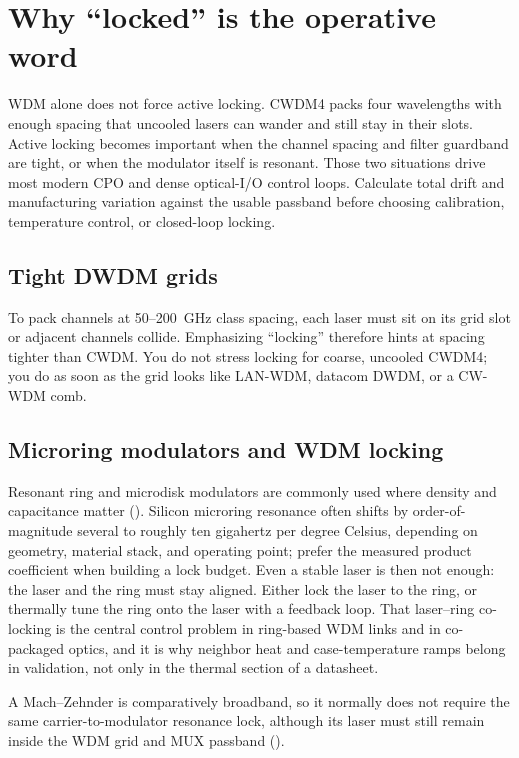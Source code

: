 \section{Why ``locked'' is the operative word}
\label{sec:why-locked}

WDM alone does not force active locking. CWDM4 packs four wavelengths with enough
spacing that uncooled lasers can wander and still stay in their slots. Active
locking becomes important when the channel spacing and filter guardband are
tight, or when the modulator itself is resonant. Those two situations drive most
modern CPO and dense optical-I/O control loops. Calculate total drift and
manufacturing variation against the usable passband before choosing calibration,
temperature control, or closed-loop locking.

\subsection{Tight DWDM grids}

To pack channels at 50--200~GHz class spacing, each laser must sit on its grid
slot or adjacent channels collide. Emphasizing ``locking'' therefore hints at
spacing tighter than CWDM. You do not stress locking for coarse, uncooled CWDM4;
you do as soon as the grid looks like LAN-WDM, datacom DWDM, or a CW-WDM comb.

\subsection{Microring modulators and WDM locking}

Resonant ring and microdisk modulators are commonly used where density and
capacitance matter (). Silicon microring resonance often shifts
by order-of-magnitude several to roughly ten gigahertz per degree Celsius,
depending on geometry, material stack, and operating point; prefer the measured
product coefficient when building a lock budget. Even a stable laser is then not
enough: the laser and the ring must stay aligned. Either lock the laser to the
ring, or thermally tune the ring onto the laser with a feedback loop. That
laser--ring co-locking is the central control problem in ring-based WDM links and
in co-packaged optics, and it is why neighbor heat and case-temperature ramps
belong in validation, not only in the thermal section of a datasheet.

A Mach--Zehnder is comparatively broadband, so it normally does not require the
same carrier-to-modulator resonance lock, although its laser must still remain
inside the WDM grid and MUX passband ().
